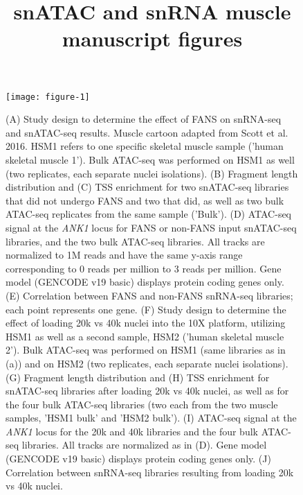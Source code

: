 \documentclass{article}
\title{snATAC and snRNA muscle manuscript figures}
\begin{document}

\maketitle
\pagestyle{empty}

  
\renewcommand{\thefigure}{\textbf{\arabic{figure}. }}
\setcounter{figure}{0}
	

\begin{figure}
\texttt{[image: figure-1]}
	\caption{(A) Study design to determine the effect of FANS on snRNA-seq and snATAC-seq results. Muscle cartoon adapted from Scott et al. 2016. HSM1 refers to one specific skeletal muscle sample ('human skeletal muscle 1'). Bulk ATAC-seq was performed on HSM1 as well (two replicates, each separate nuclei isolations). (B) Fragment length distribution and (C) TSS enrichment for two snATAC-seq libraries that did not undergo FANS and two that did, as well as two bulk ATAC-seq replicates from the same sample ('Bulk'). (D) ATAC-seq signal at the \textit{ANK1} locus for FANS or non-FANS input snATAC-seq libraries, and the two bulk ATAC-seq libraries. All tracks are normalized to 1M reads and have the same y-axis range corresponding to 0 reads per million to 3 reads per million. Gene model (GENCODE v19 basic) displays protein coding genes only. (E) Correlation between FANS and non-FANS snRNA-seq libraries; each point represents one gene. (F) Study design to determine the effect of loading 20k vs 40k nuclei into the 10X platform, utilizing HSM1 as well as a second sample, HSM2 ('human skeletal muscle 2'). Bulk ATAC-seq was performed on HSM1 (same libraries as in (a)) and on HSM2 (two replicates, each separate nuclei isolations). (G) Fragment length distribution and (H) TSS enrichment for snATAC-seq libraries after loading 20k vs 40k nuclei, as well as for the four bulk ATAC-seq libraries (two each from the two muscle samples, 'HSM1 bulk' and 'HSM2 bulk'). (I) ATAC-seq signal at the \textit{ANK1} locus for the 20k and 40k libraries and the four bulk ATAC-seq libraries. All tracks are normalized as in (D). Gene model (GENCODE v19 basic) displays protein coding genes only. (J) Correlation between snRNA-seq libraries resulting from loading 20k vs 40k nuclei.}
\end{figure}
\end{document}
